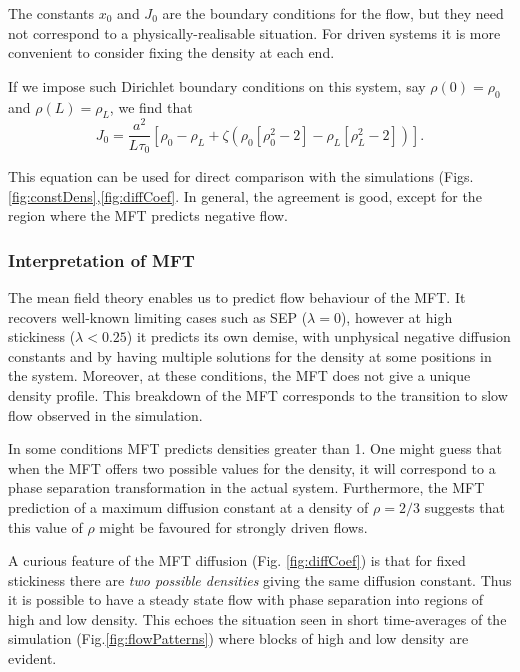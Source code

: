 \documentclass[
reprint, amsmath,amssymb, aps,
]{revtex4-1}
\begin{document}
The constants $x_0$ and $J_0$ are the boundary conditions for the
flow, but they need not correspond to a physically-realisable
situation.  For driven systems it is more convenient to consider fixing
the density at each end. 

If we impose such Dirichlet boundary conditions on this system, say
$\rho(0)=\rho_0$ and $\rho(L)=\rho_L$, we find that
\begin{equation}\label{eq:MFTflow}
 J_0 = \frac{a^2}{L \tau_0} \left[ \rho_0 - \rho_L + \zeta \left( \rho_0\left[\rho_0^2-2\right] - \rho_L\left[\rho_L^2-2\right] \right) \right].
\end{equation}

This equation can be used for direct comparison with the simulations
(Figs.\ref{fig:constDens},\ref{fig:diffCoef}.  In general, the agreement is
good, except for the region where the MFT predicts negative flow.


\subsubsection{Interpretation of MFT}

The mean field theory enables us to predict flow behaviour of the MFT.
It recovers well-known limiting cases such as SEP ($\lambda=0$),
however at high stickiness ($\lambda<0.25$) it predicts its own
demise, with unphysical negative diffusion constants and by having
multiple solutions for the density at some positions in the system.
Moreover, at these conditions, the MFT does not give a unique density
profile.  This breakdown of the MFT corresponds to the transition to
slow flow observed in the simulation.

In some
conditions MFT predicts densities greater than 1.  One might guess that when the
MFT offers two possible values for the density, it will correspond to
a phase separation transformation in the actual system. Furthermore,
the MFT prediction of a maximum diffusion constant at a density of
$\rho=2/3$ suggests that this value of $\rho$ might be favoured for
strongly driven flows.

A curious feature of the MFT diffusion (Fig. \ref{fig:diffCoef}) is
that for fixed stickiness there are {\it two possible densities}
giving the same diffusion constant.  Thus it is possible to have a
steady state flow with phase separation into regions of high and low
density. This echoes the situation seen in short time-averages of the
simulation (Fig.\ref{fig:flowPatterns}) where blocks of high and low
density are evident.
\end{document}
